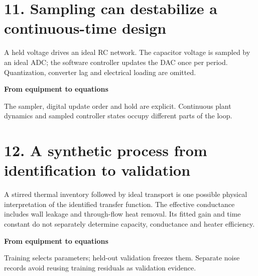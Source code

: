 \documentclass[10pt,a4paper]{article}
\begin{document}
\section*{11. Sampling can destabilize a continuous-time design}
\begin{center}\resizebox{.88\linewidth}{!}{}\par{\small A held voltage drives an ideal RC network. The capacitor voltage is sampled by an ideal ADC; the software controller updates the DAC once per period. Quantization, converter lag and electrical loading are omitted.}\end{center}
\medskip\textbf{From equipment to equations}\par
\begin{center}\resizebox{\ifdim\width>.98\linewidth.98\linewidth\else\width\fi}{!}{}\par{\small The sampler, digital update order and hold are explicit. Continuous plant dynamics and sampled controller states occupy different parts of the loop.}\end{center}

\newpage
\section*{12. A synthetic process from identification to validation}
\begin{center}\resizebox{.84\linewidth}{!}{}\par{\small A stirred thermal inventory followed by ideal transport is one possible physical interpretation of the identified transfer function. The effective conductance includes wall leakage and through-flow heat removal. Its fitted gain and time constant do not separately determine capacity, conductance and heater efficiency.}\end{center}
\medskip\textbf{From equipment to equations}\par
\begin{center}\resizebox{\ifdim\width>.98\linewidth.98\linewidth\else\width\fi}{!}{}\par{\small Training selects parameters; held-out validation freezes them. Separate noise records avoid reusing training residuals as validation evidence.}\end{center}
\end{document}
